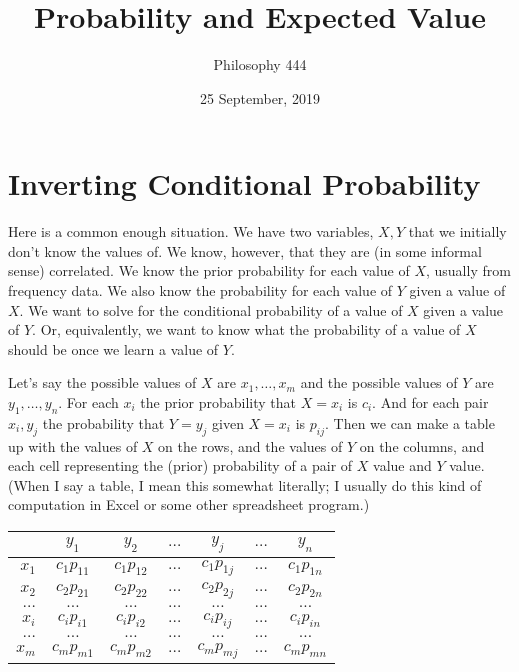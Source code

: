 \documentclass[11pt,]{article}
\title{Probability and Expected Value}
\author{Philosophy 444}
\date{25 September, 2019}
\begin{document}
\maketitle

\hypertarget{inverting-conditional-probability}{%
\section{Inverting Conditional
Probability}\label{inverting-conditional-probability}}

Here is a common enough situation. We have two variables, \(X, Y\) that
we initially don't know the values of. We know, however, that they are
(in some informal sense) correlated. We know the prior probability for
each value of \(X\), usually from frequency data. We also know the
probability for each value of \(Y\) given a value of \(X\). We want to
solve for the conditional probability of a value of \(X\) given a value
of \(Y\). Or, equivalently, we want to know what the probability of a
value of \(X\) should be once we learn a value of \(Y\).

Let's say the possible values of \(X\) are \(x_1, \dots, x_m\) and the
possible values of \(Y\) are \(y_1, \dots, y_n\). For each \(x_i\) the
prior probability that \(X = x_i\) is \(c_i\). And for each pair
\(x_i, y_j\) the probability that \(Y = y_j\) given \(X = x_i\) is
\(p_{ij}\). Then we can make a table up with the values of \(X\) on the
rows, and the values of \(Y\) on the columns, and each cell representing
the (prior) probability of a pair of \(X\) value and \(Y\) value. (When
I say a table, I mean this somewhat literally; I usually do this kind of
computation in Excel or some other spreadsheet program.)

\begin{longtable}[]{@{}rcccccc@{}}
\toprule
& \(y_1\) & \(y_2\) & \(\dots\) & \(y_j\) & \(\dots\) &
\(y_n\)\tabularnewline
\midrule
\endhead
\(x_1\) & \(c_1p_{11}\) & \(c_1p_{12}\) & \(\dots\) & \(c_1p_{1j}\) &
\(\dots\) & \(c_1p_{1n}\)\tabularnewline
\(x_2\) & \(c_2p_{21}\) & \(c_2p_{22}\) & \(\dots\) & \(c_2p_{2j}\) &
\(\dots\) & \(c_2p_{2n}\)\tabularnewline
\(\dots\) & \(\dots\) & \(\dots\) & \(\dots\) & \(\dots\) & \(\dots\) &
\(\dots\)\tabularnewline
\(x_i\) & \(c_ip_{i1}\) & \(c_ip_{i2}\) & \(\dots\) & \(c_ip_{ij}\) &
\(\dots\) & \(c_ip_{in}\)\tabularnewline
\(\dots\) & \(\dots\) & \(\dots\) & \(\dots\) & \(\dots\) & \(\dots\) &
\(\dots\)\tabularnewline
\(x_m\) & \(c_mp_{m1}\) & \(c_mp_{m2}\) & \(\dots\) & \(c_mp_{mj}\) &
\(\dots\) & \(c_mp_{mn}\)\tabularnewline
\bottomrule
\end{longtable}
\end{document}
